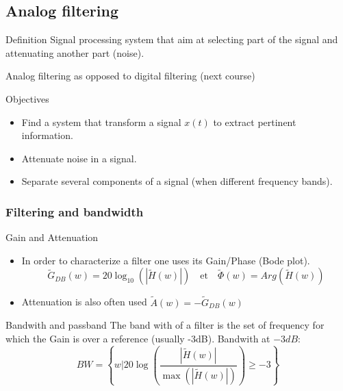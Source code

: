 \subsection{Analog filtering}
\label{sec:analogfiltering}

\begin{block}{Definition}
    Signal processing system that aim at selecting part of the signal and attenuating another part (noise).

Analog filtering as opposed to digital filtering (next course)
  \end{block}


  \begin{block}{Objectives}
    \begin{itemize}
    \item Find a system that transform a signal $x(t)$ to extract pertinent information.
    \item Attenuate noise in a  signal.
    \item Separate several components of a signal (when different frequency bands).
    \end{itemize}
  \end{block}

  \frametitle{Filtering and bandwidth}

  \begin{block}{Gain and Attenuation}

    \begin{itemize}
    \item In order to characterize a filter one uses its 
    Gain/Phase (Bode plot).
$$\tilde G_{DB}(w)=20\log_{10}(|\tilde H(w)|)\quad \text{et}\quad
\tilde \Phi(w)=Arg(\tilde H(w))$$
     \item Attenuation is also often used $\tilde A(w)=-\tilde G_{DB}(w)$
 \end{itemize}
  \end{block}\vspace{-1mm}

  \begin{block}{Bandwith and passband}
   The band with of a filter is the set of frequency for which the Gain is over a reference
   (usually -3dB).
Bandwith at  $-3dB$:
\begin{equation*}
 BW= \left\{w|20\log\left(\frac{|\tilde H(w)|}{\max(|\tilde H(w)|)}\right)\geq-3\right\}
\end{equation*}
  \end{block} \vspace{-1mm}

